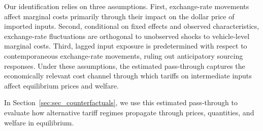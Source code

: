 \documentclass[11pt]{article}
\begin{document}
Our identification relies on three assumptions. First, exchange-rate movements affect marginal costs primarily through their impact on the dollar price of imported inputs. Second, conditional on fixed effects and observed characteristics, exchange-rate fluctuations are orthogonal to unobserved shocks to vehicle-level marginal costs. Third, lagged input exposure is predetermined with respect to contemporaneous exchange-rate movements, ruling out anticipatory sourcing responses. Under these assumptions, the estimated pass-through captures the economically relevant cost channel through which tariffs on intermediate inputs affect equilibrium prices and welfare.

In Section~\ref{sec:sec_counterfactuals}, we use this estimated pass-through to evaluate how alternative tariff regimes propagate through prices, quantities, and welfare in equilibrium.

\end{document}
